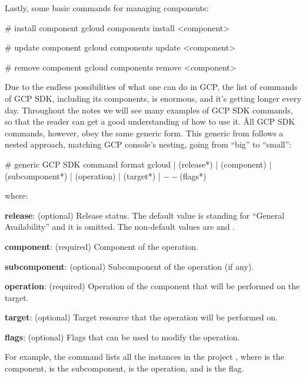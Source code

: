 Lastly, some basic commands for managing components:
\begin{bash}
# install component
gcloud components install <component>
\end{bash}

\begin{bash}
# update component
gcloud components update <component>
\end{bash}

\begin{bash}
# remove component
gcloud components remove <component>
\end{bash}

Due to the endless possibilities of what one can do in GCP, the list of commands of GCP SDK, including its
components, is enormous, and it's getting longer every day. Throughout the notes we will see many examples of GCP
SDK commands, so that the reader can get a good understanding of how to use it. \v

All GCP SDK commands, however, obey the same generic form. This generic from follows a nested approach, matching GCP
console's nesting, going from ``big'' to ``small'':
\begin{bash}
# generic GCP SDK command format
gcloud | (release*) | (component) | (subcomponent*) | (operation) | (target*) | $--$(flags*)
\end{bash}

where:
\bit
\item \textbf{release}: (optional) Release status. The default value is  standing for ``General Availability''
and it is omitted. The non-default values are  and .
\item \textbf{component}: (required) Component of the operation.
\item \textbf{subcomponent}: (optional) Subcomponent of the operation (if any).
\item \textbf{operation}: (required) Operation of the component that will be performed on the target.
\item \textbf{target}: (optional) Target resource that the operation will be performed on.
\item \textbf{flags}: (optional) Flags that can be used to modify the operation.
\eit

\be
For example, the command  lists all the instances in the
project , where  is the component,  is the subcomponent, 
is the operation, and  is the flag.
\ee

